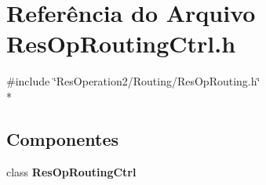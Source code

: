\section{Referência do Arquivo Res\+Op\+Routing\+Ctrl.\+h}
\label{_res_op_routing_ctrl_8h}
{\ttfamily \#include \char`\"{}Res\+Operation2/\+Routing/\+Res\+Op\+Routing.\+h\char`\"{}}\\*
\subsection*{Componentes}
\begin{DoxyCompactItemize}
\item 
class {\bf Res\+Op\+Routing\+Ctrl}
\end{DoxyCompactItemize}
